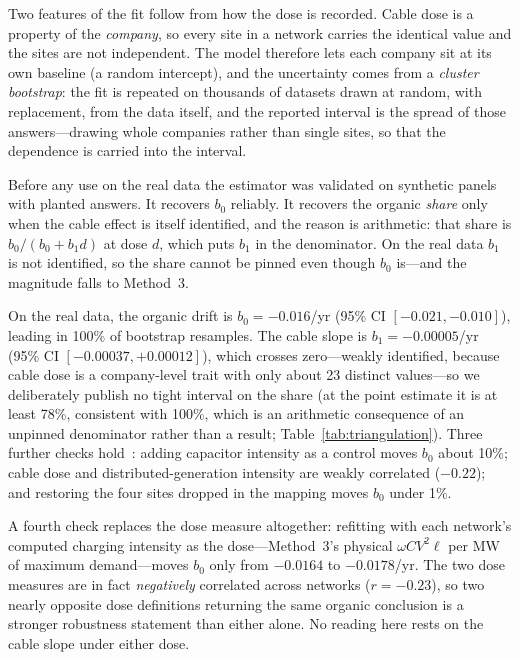 \documentclass[journal]{IEEEtran}
\begin{document}
Two features of the fit follow from how the dose is recorded. Cable dose is a
property of the \emph{company}, so every site in a network carries the identical
value and the sites are not independent. The model therefore lets each company
sit at its own baseline (a random intercept), and the uncertainty comes from a
\emph{cluster bootstrap}: the fit is repeated on thousands of datasets drawn at
random, with replacement, from the data itself, and the reported interval is the
spread of those answers---drawing whole companies rather than single sites, so
that the dependence is carried into the interval.

Before any use on the real data the estimator was validated on synthetic panels
with planted answers. It recovers $b_0$ reliably. It recovers the organic
\emph{share} only when the cable effect is itself identified, and the reason is
arithmetic: that share is $b_0/(b_0+b_1 d)$ at dose $d$, which puts $b_1$ in the
denominator. On the real data $b_1$ is not identified, so the share cannot be
pinned even though $b_0$ is---and the magnitude falls to Method~3.

On the real data, the organic drift is $b_0=-0.016$/yr (95\% CI
$[-0.021,-0.010]$), leading in 100\% of bootstrap resamples. The cable slope is
$b_1=-0.00005$/yr (95\% CI $[-0.00037,+0.00012]$), which crosses zero---weakly
identified, because cable dose is a company-level trait with only about 23
distinct values---so we deliberately publish no tight interval on the share (at
the point estimate it is at least 78\%, consistent with 100\%, which is
an arithmetic consequence of an unpinned denominator rather than a result;
Table~\ref{tab:triangulation}). Three further checks hold~\cite{hume_extended}: adding capacitor intensity as a control moves $b_0$ about 10\%; cable dose and distributed-generation intensity are weakly correlated ($-0.22$); and restoring the four sites dropped in the mapping moves $b_0$ under 1\%.

A fourth check replaces the dose measure altogether: refitting with each
network's computed charging intensity as the dose---Method~3's physical $\omega C
V^2 \ell$ per MW of maximum demand---moves $b_0$ only from $-0.0164$ to
$-0.0178$/yr. The two dose measures are in fact \emph{negatively} correlated
across networks ($r=-0.23$), so two nearly opposite dose definitions returning
the same organic conclusion is a stronger robustness statement than either alone.
No reading here rests on the cable slope under either dose.
\end{document}
